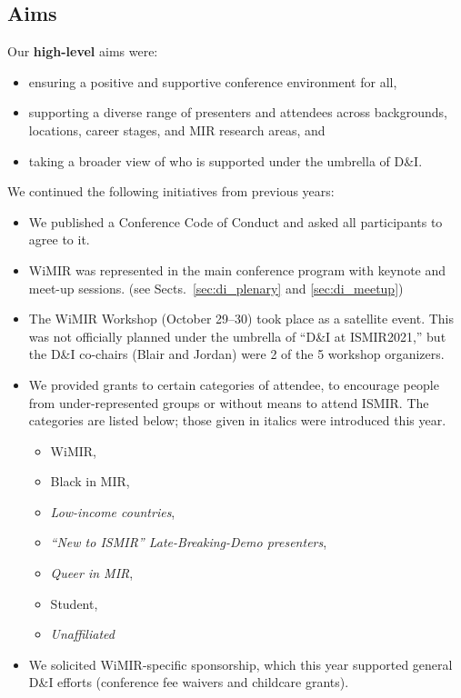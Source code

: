 \documentclass[%
10pt,								%
titlepage,						%
]
{scrartcl}
\begin{document}
    \subsection{Aims}
        Our \textbf{high-level} aims were:
        \begin{itemize}
            \item   ensuring a positive and supportive conference environment for all,
            \item   supporting a diverse range of presenters and attendees across backgrounds, locations, career stages, and MIR research areas, and
            \item   taking a broader view of who is supported under the umbrella of D\&I.
        \end{itemize}

        We continued the following initiatives from previous years:
        \begin{itemize}
            \item   We published a Conference Code of Conduct and asked all participants to agree to it.
            \item   WiMIR was represented in the main conference program with keynote and meet-up sessions. (see Sects.~\ref{sec:di_plenary} and \ref{sec:di_meetup})
            \item   The WiMIR Workshop (October 29--30) took place as a satellite event. This was not officially planned under the umbrella of ``D\&I at ISMIR2021,'' but the D\&I co-chairs (Blair and Jordan) were 2 of the 5 workshop organizers.
            \item   We provided grants to certain categories of attendee, to encourage people from under-represented groups or without means to attend ISMIR. The categories are listed below; those given in italics were introduced this year.
                \begin{itemize}
                    \item   WiMIR,
                    \item   Black in MIR,
                    \item   \textit{Low-income countries},
                    \item   \textit{``New to ISMIR'' Late-Breaking-Demo presenters},
                    \item   \textit{Queer in MIR},
                    \item   Student,
                    \item   \textit{Unaffiliated}
                \end{itemize}
            \item   We solicited WiMIR-specific sponsorship, which this year supported general D\&I efforts (conference fee waivers and childcare grants).
        \end{itemize}
\end{document}
